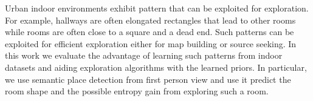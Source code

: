Urban indoor environments exhibit pattern that can be exploited for exploration.
For example, hallways are often elongated rectangles that lead to other rooms
while rooms are often close to a square and a dead end.
Such patterns can be exploited for efficient exploration either for map building
or source seeking.
In this work we evaluate the advantage of learning such patterns from indoor
datasets and aiding exploration algorithms with the learned priors.
In particular, we use semantic place detection from first person view and use it
predict the room shape and the possible entropy gain from exploring such a room.
